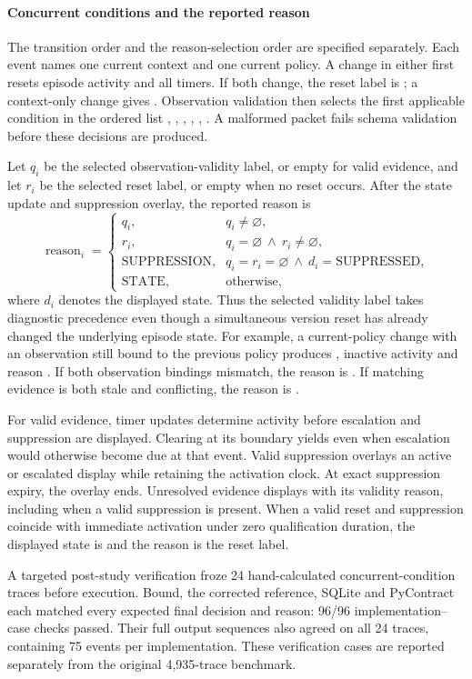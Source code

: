 \paragraph{Concurrent conditions and the reported reason}
The transition order and the reason-selection order are specified separately. Each event names one current context and one current policy. A change in either first resets episode activity and all timers. If both change, the reset label is ; a context-only change gives . Observation validation then selects the first applicable condition in the ordered list , , , , , . A malformed packet fails schema validation before these decisions are produced.

Let $q_i$ be the selected observation-validity label, or empty for valid evidence, and let $r_i$ be the selected reset label, or empty when no reset occurs. After the state update and suppression overlay, the reported reason is
\begin{equation}
\operatorname{reason}_i=
\begin{cases}
q_i, & q_i\ne\varnothing,\\
r_i, & q_i=\varnothing\ \land\ r_i\ne\varnothing,\\
\text{SUPPRESSION}, & q_i=r_i=\varnothing\ \land\ d_i=\text{SUPPRESSED},\\
\text{STATE}, & \text{otherwise},
\end{cases}
\end{equation}
where $d_i$ denotes the displayed state. Thus the selected validity label takes diagnostic precedence even though a simultaneous version reset has already changed the underlying episode state. For example, a current-policy change with an observation still bound to the previous policy produces , inactive activity and reason . If both observation bindings mismatch, the reason is . If matching evidence is both stale and conflicting, the reason is .

For valid evidence, timer updates determine activity before escalation and suppression are displayed. Clearing at its boundary yields  even when escalation would otherwise become due at that event. Valid suppression overlays an active or escalated display while retaining the activation clock. At exact suppression expiry, the overlay ends. Unresolved evidence displays  with its validity reason, including when a valid suppression is present. When a valid reset and suppression coincide with immediate activation under zero qualification duration, the displayed state is  and the reason is the reset label.

A targeted post-study verification froze 24 hand-calculated concurrent-condition traces before execution. Bound, the corrected reference, SQLite and PyContract each matched every expected final decision and reason: 96/96 implementation--case checks passed. Their full output sequences also agreed on all 24 traces, containing 75 events per implementation. These verification cases are reported separately from the original 4,935-trace benchmark.
